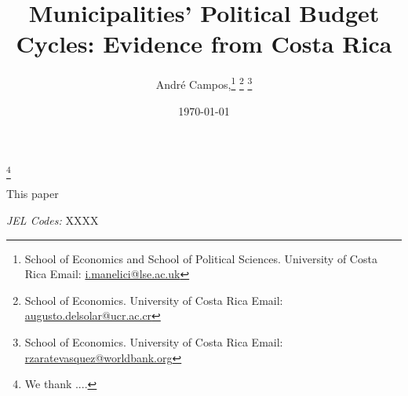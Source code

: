 \documentclass[12pt,a4paper]{article}
\begin{document}
\title{\huge{Municipalities' Political Budget Cycles: Evidence from Costa Rica}}\thanks{\footnotesize We thank ....}

\author{\large \vspace{0.5cm} André Campos,\thanks{School of Economics and School of Political Sciences. University of Costa Rica Email: \href{mailto:i.manelici@lse.ac.uk}{i.manelici@lse.ac.uk}}
\thanks{School of Economics. University of Costa Rica Email: \href{mailto:augusto.delsolar@ucr.ac.cr}{augusto.delsolar@ucr.ac.cr}}
\thanks{School of Economics. University of Costa Rica Email: \href{mailto:rzaratevasquez@worldbank.org}{rzaratevasquez@worldbank.org}}
}
\renewcommand\Authands{ and }
\date{\today}


\onehalfspacing
\setlength{\parindent}{1cm}
\clearpage\maketitle
\thispagestyle{empty}
\setcounter{page}{0}
\maketitle

\begin{small}
\onehalfspacing
\vspace{0.75cm}
This paper 
\vspace{20pt}

\textit{JEL Codes:} XXXX
\end{small}


\end{document}
